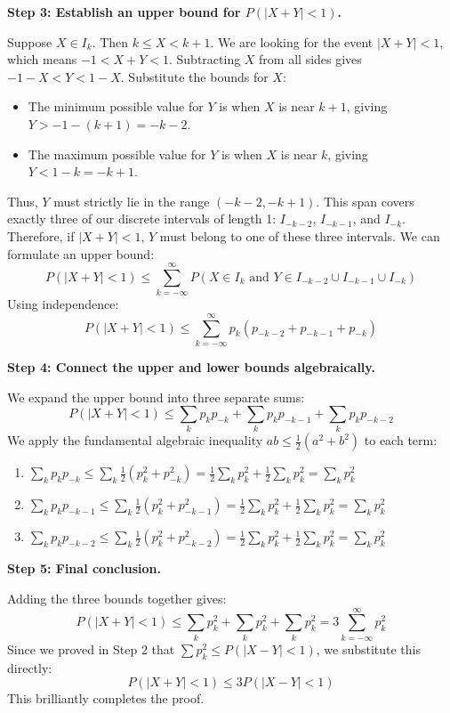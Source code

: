 \begin{solution}
\textbf{Step 3: Establish an upper bound for $P(|X+Y| < 1)$.}

Suppose $X \in I_k$. Then $k \leq X < k+1$.
We are looking for the event $|X+Y| < 1$, which means $-1 < X+Y < 1$.
Subtracting $X$ from all sides gives $-1-X < Y < 1-X$.
Substitute the bounds for $X$:
\begin{itemize}
    \item The minimum possible value for $Y$ is when $X$ is near $k+1$, giving $Y > -1 - (k+1) = -k-2$.
    \item The maximum possible value for $Y$ is when $X$ is near $k$, giving $Y < 1 - k = -k+1$.
\end{itemize}
Thus, $Y$ must strictly lie in the range $(-k-2, -k+1)$.
This span covers exactly three of our discrete intervals of length 1: $I_{-k-2}$, $I_{-k-1}$, and $I_{-k}$.
Therefore, if $|X+Y| < 1$, $Y$ must belong to one of these three intervals. We can formulate an upper bound:
\[ P(|X+Y| < 1) \leq \sum_{k=-\infty}^\infty P(X \in I_k \text{ and } Y \in I_{-k-2} \cup I_{-k-1} \cup I_{-k}) \]
Using independence:
\[ P(|X+Y| < 1) \leq \sum_{k=-\infty}^\infty p_k (p_{-k-2} + p_{-k-1} + p_{-k}) \]

\textbf{Step 4: Connect the upper and lower bounds algebraically.}

We expand the upper bound into three separate sums:
\[ P(|X+Y| < 1) \leq \sum_{k} p_k p_{-k} + \sum_{k} p_k p_{-k-1} + \sum_{k} p_k p_{-k-2} \]
We apply the fundamental algebraic inequality $ab \leq \frac{1}{2}(a^2 + b^2)$ to each term:
\begin{enumerate}
    \item $\sum_k p_k p_{-k} \leq \sum_k \frac{1}{2}(p_k^2 + p_{-k}^2) = \frac{1}{2} \sum_k p_k^2 + \frac{1}{2} \sum_k p_k^2 = \sum_k p_k^2$
    \item $\sum_k p_k p_{-k-1} \leq \sum_k \frac{1}{2}(p_k^2 + p_{-k-1}^2) = \frac{1}{2} \sum_k p_k^2 + \frac{1}{2} \sum_k p_k^2 = \sum_k p_k^2$
    \item $\sum_k p_k p_{-k-2} \leq \sum_k \frac{1}{2}(p_k^2 + p_{-k-2}^2) = \frac{1}{2} \sum_k p_k^2 + \frac{1}{2} \sum_k p_k^2 = \sum_k p_k^2$
\end{enumerate}

\textbf{Step 5: Final conclusion.}

Adding the three bounds together gives:
\[ P(|X+Y| < 1) \leq \sum_k p_k^2 + \sum_k p_k^2 + \sum_k p_k^2 = 3 \sum_{k=-\infty}^\infty p_k^2 \]
Since we proved in Step 2 that $\sum p_k^2 \leq P(|X-Y| < 1)$, we substitute this directly:
\[ P(|X+Y| < 1) \leq 3 P(|X-Y| < 1) \]
This brilliantly completes the proof.
\end{solution}

